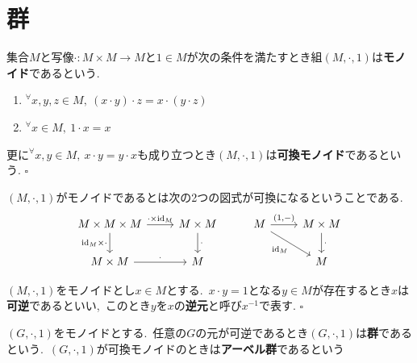 \section{群}
\begin{definition}
集合$M$と写像$\cdot \colon M \times M \to M$と$1 \in M$が次の条件を満たすとき組$(M, \cdot, 1)$は\textbf{モノイド}であるという.
\def\labelenumi{(\theenumi)}
\begin{enumerate}
    \item $^{\forall}x,y,z \in M,\ (x \cdot y) \cdot z = x \cdot (y \cdot z)$
    \item $^{\forall}x \in M,\ 1 \cdot x = x$
\end{enumerate}
更に$^{\forall}x,y \in M,\ x \cdot y = y \cdot x$も成り立つとき$(M, \cdot, 1)$は\textbf{可換モノイド}であるという.
\hfill $\square$
\end{definition}

$(M, \cdot, 1)$がモノイドであるとは次の2つの図式が可換になるということである.
\[\begin{tikzcd}
	{M \times M \times M} & {M \times M} & M & {M \times M} \\
	{M \times M} & { M} && M
	\arrow["{\cdot \times \textrm{id}_M}", from=1-1, to=1-2]
	\arrow["{\textrm{id}_M \times \cdot}"', from=1-1, to=2-1]
	\arrow["\cdot", from=1-2, to=2-2]
	\arrow["{(1,-)}", from=1-3, to=1-4]
	\arrow["{\textrm{id}_M}"', from=1-3, to=2-4]
	\arrow["\cdot", from=1-4, to=2-4]
	\arrow["\cdot", from=2-1, to=2-2]
\end{tikzcd}\]

\begin{definition}
$(M, \cdot, 1)$をモノイドとし$x \in M$とする.\ $x \cdot y = 1$となる$y \in M$が存在するとき$x$は\textbf{可逆}であるといい,\ このとき$y$を$x$の\textbf{逆元}と呼び$x^{-1}$で表す.
\hfill $\square$
\end{definition}

\begin{definition}
$(G, \cdot, 1)$をモノイドとする.\ 任意の$G$の元が可逆であるとき$(G, \cdot, 1)$は\textbf{群}であるという.\ $(G, \cdot, 1)$が可換モノイドのときは\textbf{アーベル群}であるという
\end{definition}